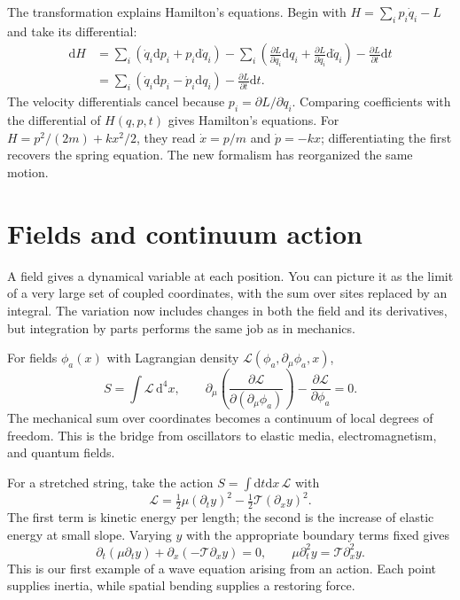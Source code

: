 \documentclass[11pt,oneside]{book}
\newcommand{\dd}{\mathrm{d}}
\newcommand{\pd}[2]{\frac{\partial #1}{\partial #2}}
\theoremstyle{reviewstyle}
\begin{document}
The transformation explains Hamilton's equations. Begin with $H=\sum_i p_i\dot q_i-L$ and take its differential:
\begin{align}
\dd H&=\sum_i(\dot q_i\dd p_i+p_i\dd\dot q_i)
-\sum_i\left(\pd L{q_i}\dd q_i+\pd L{\dot q_i}\dd\dot q_i\right)-\pd Lt\dd t\\
&=\sum_i(\dot q_i\dd p_i-\dot p_i\dd q_i)-\pd Lt\dd t.
\end{align}
The velocity differentials cancel because $p_i=\partial L/\partial\dot q_i$. Comparing coefficients with the differential of $H(q,p,t)$ gives Hamilton's equations. For $H=p^2/(2m)+kx^2/2$, they read $\dot x=p/m$ and $\dot p=-kx$; differentiating the first recovers the spring equation. The new formalism has reorganized the same motion.

\section{Fields and continuum action}
A field gives a dynamical variable at each position. You can picture it as the limit of a very large set of coupled coordinates, with the sum over sites replaced by an integral. The variation now includes changes in both the field and its derivatives, but integration by parts performs the same job as in mechanics.

For fields $\phi_a(x)$ with Lagrangian density $\mathcal L(\phi_a,\partial_\mu\phi_a,x)$,
\begin{equation}
S=\int\mathcal L\,\dd^4x,\qquad
\partial_\mu\left(\pd{\mathcal L}{(\partial_\mu\phi_a)}\right)-\pd{\mathcal L}{\phi_a}=0.
\end{equation}
The mechanical sum over coordinates becomes a continuum of local degrees of freedom. This is the bridge from oscillators to elastic media, electromagnetism, and quantum fields.

For a stretched string, take the action $S=\int\dd t\dd x\,\mathcal L$ with
\begin{equation}
\mathcal L=\tfrac12\mu(\partial_ty)^2-\tfrac12\mathcal T(\partial_xy)^2.
\end{equation}
The first term is kinetic energy per length; the second is the increase of elastic energy at small slope. Varying $y$ with the appropriate boundary terms fixed gives
\begin{equation}
\partial_t(\mu\partial_ty)+\partial_x(-\mathcal T\partial_xy)=0,
\qquad \mu\partial_t^2y=\mathcal T\partial_x^2y.
\end{equation}
This is our first example of a wave equation arising from an action. Each point supplies inertia, while spatial bending supplies a restoring force.
\end{document}
